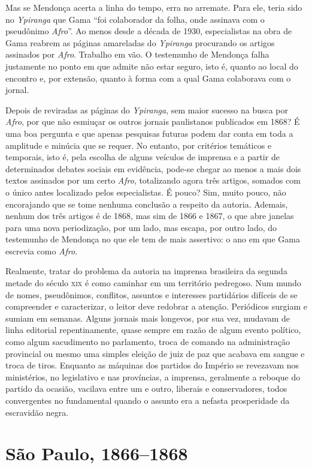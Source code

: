 Mas se Mendonça acerta a linha do tempo, erra no arremate. Para ele,
teria sido no \emph{Ypiranga} que Gama ``foi colaborador da folha, onde
assinava com o pseudônimo \emph{Afro}''. Ao menos desde a década de 1930,
especialistas na obra de Gama reabrem as páginas amareladas do 
\emph{Ypiranga} procurando os artigos assinados por \emph{Afro}. Trabalho 
em vão. O testemunho de Mendonça falha justamente no ponto em que admite
não estar seguro, isto é, quanto ao local do encontro e, por extensão,
quanto à forma com a qual Gama colaborava com o jornal.

Depois de reviradas as páginas do \emph{Ypiranga}, sem maior sucesso na
busca por \emph{Afro}, por que não esmiuçar os outros jornais
paulistanos publicados em 1868? É uma boa pergunta e que apenas
pesquisas futuras podem dar conta em toda a amplitude e minúcia que se
requer. No entanto, por critérios temáticos e temporais, isto é, pela
escolha de alguns veículos de imprensa e a partir de determinados
debates sociais em evidência, pode-se chegar ao menos a mais dois textos
assinados por um certo \emph{Afro}, totalizando agora três artigos,
somados com o único antes localizado pelos especialistas. É pouco? Sim,
muito pouco, não encorajando que se tome nenhuma conclusão a respeito da
autoria. Ademais, nenhum dos três artigos é de 1868, mas sim de 1866 e
1867, o que abre janelas para uma nova periodização, por um lado, mas
escapa, por outro lado, do testemunho de Mendonça no que ele tem de mais
assertivo: o ano em que Gama escrevia como \emph{Afro}.

Realmente, tratar do problema da autoria na imprensa brasileira da
segunda metade do século \textsc{xix} é como caminhar em um território pedregoso.
Num mundo de nomes, pseudônimos, conflitos, assuntos e interesses
partidários difíceis de se compreender e caracterizar, o leitor deve
redobrar a atenção. Periódicos surgiam e sumiam em semanas. Alguns
jornais mais longevos, por sua vez, mudavam de linha editorial
repentinamente, quase sempre em razão de algum evento político, como
algum sacudimento no parlamento, troca de comando na administração
provincial ou mesmo uma simples eleição de juiz de paz que acabava em
sangue e troca de tiros. Enquanto as máquinas dos partidos do Império se
revezavam nos ministérios, no legislativo e nas províncias, a imprensa,
geralmente a reboque do partido da ocasião, vacilava entre um e outro,
liberais e conservadores, todos convergentes no fundamental quando o
assunto era a nefasta prosperidade da escravidão negra.

\section{São Paulo, 1866--1868}

